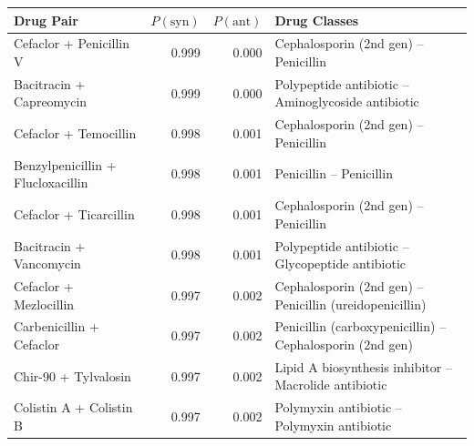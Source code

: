 \documentclass{article}
\begin{document}
\centering

\begin{minipage}{0.98\textwidth}
    \centering
    \small
    \setlength{\tabcolsep}{10pt}


    \begin{tabular}{@{} l r r l @{}}
        \toprule
        Drug Pair
                                          & $P(\mathrm{syn})$
                                          & $P(\mathrm{ant})$
                                          & Drug Classes                                                                          \\
        \midrule
        Cefaclor + Penicillin V           & 0.999             & 0.000 & Cephalosporin (2nd gen) -- Penicillin                     \\
        Bacitracin + Capreomycin          & 0.999             & 0.000 & Polypeptide antibiotic -- Aminoglycoside antibiotic       \\
        Cefaclor + Temocillin             & 0.998             & 0.001 & Cephalosporin (2nd gen) -- Penicillin                     \\
        Benzylpenicillin + Flucloxacillin & 0.998             & 0.001 & Penicillin -- Penicillin                                  \\
        Cefaclor + Ticarcillin            & 0.998             & 0.001 & Cephalosporin (2nd gen) -- Penicillin                     \\
        Bacitracin + Vancomycin           & 0.998             & 0.001 & Polypeptide antibiotic -- Glycopeptide antibiotic         \\
        Cefaclor + Mezlocillin            & 0.997             & 0.002 & Cephalosporin (2nd gen) -- Penicillin (ureidopenicillin)  \\
        Carbenicillin + Cefaclor          & 0.997             & 0.002 & Penicillin (carboxypenicillin) -- Cephalosporin (2nd gen) \\
        Chir-90 + Tylvalosin              & 0.997             & 0.002 & Lipid A biosynthesis inhibitor -- Macrolide antibiotic    \\
        Colistin A + Colistin B           & 0.997             & 0.002 & Polymyxin antibiotic -- Polymyxin antibiotic              \\
        \bottomrule
    \end{tabular}
\end{minipage}

\vspace{1.5em}
\end{document}
